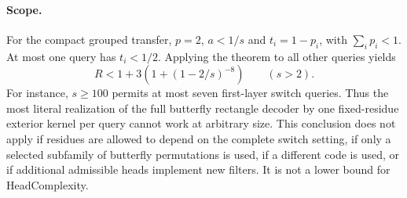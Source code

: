 \documentclass[11pt]{article}
\begin{document}
\paragraph{Scope.}
For the compact grouped transfer, $p=2$, $a<1/s$ and
$t_i=1-p_i$, with $\sum_i p_i<1$. At most one query has $t_i<1/2$.
Applying the theorem to all other queries yields
\[
 R<1+3\left(1+(1-2/s)^{-8}\right)\qquad(s>2).
\]
For instance, $s\geq100$ permits at most seven first-layer switch
queries. Thus the most literal realization of the full butterfly
rectangle decoder by one fixed-residue exterior kernel per query
cannot work at arbitrary size. This conclusion does not apply if
residues are allowed to depend on the complete switch setting, if
only a selected subfamily of butterfly permutations is used, if a
different code is used, or if additional admissible heads implement
new filters. It is not a lower bound for HeadComplexity.
\end{document}
